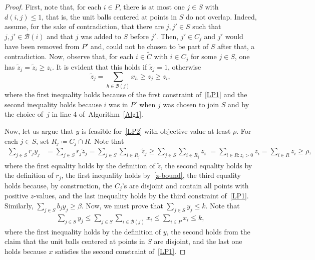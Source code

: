\begin{proof}
    First, note that, for each $i \in P$, there is at most one $j \in S$ with $d(i,j) \leq 1$, that is, the unit balls centered at points in $S$ do not overlap.
    Indeed, assume, for the sake of contradiction, that there are $j,j' \in S$ such that $j,j' \in \mathcal{B}(i)$ and that $j$ was added to $S$ before $j'$. Then, $j' \in C_j$ and $j'$ would have been removed from $P'$ and, could not be chosen to be part of $S$ after that, a contradiction.
    Now, observe that, for each $i \in \tilde{C}$ with $i \in C_j$ for some $j \in S$, one has ${\tilde{z}_j = \tilde{z}_i \geq z_i}$. It is evident that this holds if $\tilde{z}_j = 1$, otherwise  
    \begin{equation}
        \label{z-bound}
    \tilde{z}_j = \sum_{h \in \mathcal{B}(j)} x_h \geq z_j \geq z_i, 
    \end{equation}
    where the first inequality holds because of the first constraint of~\ref{LP1} and the second inequality holds because $i$ was in $P'$ when $j$ was chosen to join $S$ and by the choice of~$j$ in line 4 of~{Algorithm~\ref{Alg1}}.

    Now, let us argue that $y$ is feasible for~\ref{LP2} with objective value at least $\rho$. For each $j \in S$, set $R_j \coloneqq C_j \cap R$. Note that 
    \begin{align*}
        \sum_{j \in S} r_jy_j &= \sum_{j \in S} r_j \tilde{z}_j = \sum_{j \in S} \sum_{i \in R_j} \tilde{z}_j
        \geq \sum_{j \in S} \sum_{i \in R_j} z_i \,\,= \! \sum_{i \in R: z_i > 0 } z_i = \sum_{i \in R} z_i \geq \rho,
    \end{align*}
    where the first equality holds by the definition of $\tilde{z}$, the second equality holds by the definition of $r_j$, the first inequality holds by~\eqref{z-bound}, the third equality holds because, by construction, the $C_j$'s are disjoint and contain all points with positive $z$-values, and the last inequality holds by the third constraint of~\ref{LP1}. Similarly, \(\sum_{j \in S } b_jy_j \geq \beta\). Now, we must prove that \(\sum_{j \in S} y_j \leq k\). Note that
    \begin{align*}
    \sum_{j \in S} y_j \leq \sum_{j \in S} \sum_{i \in \mathcal{B}(j)}x_i \leq \sum_{i \in P} x_i \leq k,
    \end{align*}
    where the first inequality holds by the definition of $y$, the second holds from the claim that the unit balls centered at points in $S$ are disjoint, and the last one holds because $x$ satisfies the second constraint of~\ref{LP1}.
\end{proof}

